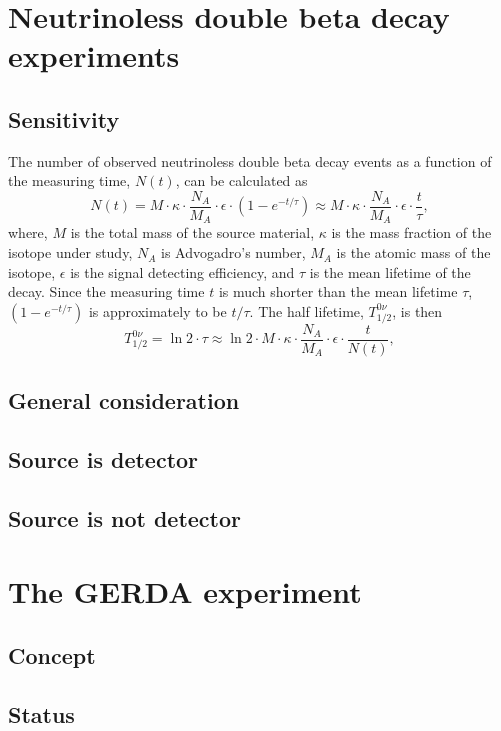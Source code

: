 \section{Neutrinoless double beta decay experiments}
\label{sec:gerda:nonubb}

\subsection{Sensitivity}
\label{sec:gerda:sensi}
The number of observed neutrinoless double beta decay events as a function of the measuring time, $N(t)$, can be calculated as
\begin{equation}
  \label{eq:gerda:nt}
  N(t) = M \cdot \kappa \cdot \frac{N_{A}}{M_{A}} \cdot \epsilon \cdot (1 - e^{-t/\tau}) \approx M \cdot \kappa \cdot \frac{N_{A}}{M_{A}} \cdot \epsilon \cdot \frac{t}{\tau},
\end{equation}
where, $M$ is the total mass of the source material, $\kappa$ is the mass fraction of the isotope under study, $N_{A}$ is Advogadro's number, $M_{A}$ is the atomic mass of the isotope, $\epsilon$ is the signal detecting efficiency, and $\tau$ is the mean lifetime of the decay. Since the measuring time $t$ is much shorter than the mean lifetime $\tau$, $(1 - e^{-t/\tau})$ is approximately to be $t/\tau$. The half lifetime, $T^{0\nu}_{1/2}$, is then
\begin{equation}
  \label{eq:gerda:hlt}
  T^{0\nu}_{1/2} = \ln2 \cdot \tau \approx \ln2 \cdot M \cdot \kappa \cdot \frac{N_{A}}{M_{A}} \cdot \epsilon \cdot \frac{t}{N(t)},
\end{equation}


\subsection{General consideration}
\label{sec:gerda:gencon}

\subsection{Source is detector}
\label{sec:gerda:sed}

\subsection{Source is not  detector}
\label{sec:gerda:sued}

\section{The GERDA experiment}
\label{sec:gerda:concept}

\subsection{Concept}
\label{sec:gerda:concept}

\subsection{Status}
\label{sec:gerda:status}


